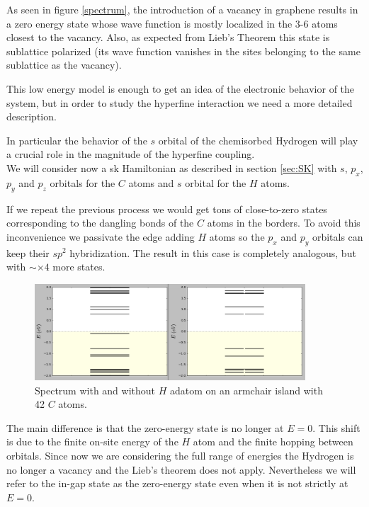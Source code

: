 As seen in figure \ref{spectrum}, the introduction of a vacancy in graphene results in a zero energy state whose wave function is mostly localized in the 3-6 atoms closest to the vacancy. Also, as expected from Lieb's Theorem this state is sublattice polarized (its wave function vanishes in the sites belonging to the same sublattice as the vacancy).

This low energy model is enough to get an idea of the electronic behavior of the system, but in order to study the hyperfine interaction we need a more detailed description.

In particular the behavior of the $s$ orbital of the chemisorbed Hydrogen will play a crucial role in the magnitude of the hyperfine coupling.\\

We will consider now a \ac{sk} Hamiltonian as described in section \ref{sec:SK} with $s$, $p_x$, $p_y$ and $p_z$ orbitals for the $C$ atoms and $s$ orbital for the $H$ atoms.

If we repeat the previous process we would get tons of close-to-zero states corresponding to the dangling bonds of the $C$ atoms in the borders. To avoid this inconvenience we passivate the edge adding $H$ atoms so the $p_x$ and $p_y$ orbitals can keep their $sp^2$ hybridization. The result in this case is completely analogous, but with $\sim\times4$ more states.\\

\begin{figure}[h!]
\centering
\includegraphics[width=0.9\textwidth]{chapter05/figures/spectrum4orb.png}
\vspace{-5pt}
\caption{Spectrum with and without $H$ adatom on an armchair island with 42 $C$ atoms.}
\label{spectrum4}
\end{figure}
\FloatBarrier

The main difference is that the zero-energy state is no longer at $E=0$. This shift is due to the finite on-site energy of the $H$ atom and the finite hopping between orbitals. Since now we are considering the full range of energies the Hydrogen is no longer a vacancy and the Lieb's theorem does not apply. Nevertheless we will refer to the in-gap state as the zero-energy state even when it is not strictly  at $E=0$.


